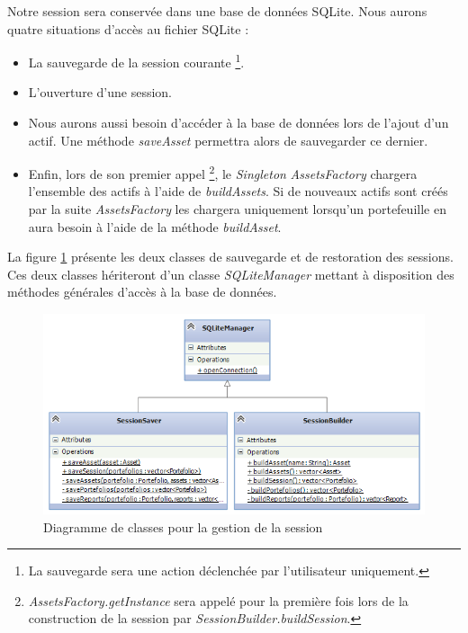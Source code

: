 \documentclass[a4paper]{report}
\begin{document}
Notre session sera conservée dans une base de données SQLite.
Nous aurons quatre situations d'accès au fichier SQLite :

\begin{itemize}
	\item La sauvegarde de la session courante \footnote{La sauvegarde sera une action déclenchée par l'utilisateur uniquement.}.
  	\item L'ouverture d'une session.
  	\item Nous aurons aussi besoin d'accéder à la base de données lors de l'ajout d'un actif.
	Une méthode \textit{saveAsset} permettra alors de sauvegarder ce dernier.
  	\item Enfin, lors de son premier appel \footnote{\textit{AssetsFactory.getInstance} sera appelé pour la première fois lors de la construction de la session par \textit{SessionBuilder.buildSession}.}, le \textit{Singleton} \textit{AssetsFactory} chargera l'ensemble des actifs à l'aide de \textit{buildAssets}.
	Si de nouveaux actifs sont créés par la suite \textit{AssetsFactory} les chargera uniquement lorsqu'un portefeuille en aura besoin à l'aide de la méthode \textit{buildAsset}.
\end{itemize}

La figure \ref{fig:diagramme-classes-interface-bdd} présente les deux classes de sauvegarde et de restoration des sessions. Ces deux classes hériteront d'un classe \textit{SQLiteManager} mettant à disposition des méthodes générales d'accès à la base de données.

\begin{figure}
  	\center
  	\includegraphics[width=1\textwidth]{diagramme-classes-interface-bdd.png}
  	\caption{Diagramme de classes pour la gestion de la session}
  	\label{fig:diagramme-classes-interface-bdd}
\end{figure}
\end{document}
